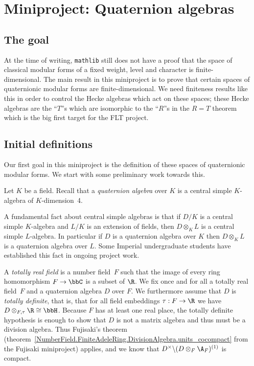 \chapter{Miniproject: Quaternion algebras}\label{Quat_alg_project}

\section{The goal}

At the time of writing, {\tt mathlib} still does not have a proof that the space
of classical modular forms of a fixed weight, level and character is finite-dimensional.
The main result in this miniproject is to prove that certain spaces of quaternionic modular forms
are finite-dimensional. We need finiteness results
like this in order to control the Hecke algebras which act on these spaces; these Hecke
algebras are the ``$T$''s which are isomorphic to the ``$R$''s in the $R=T$ theorem which
is the big first target for the FLT project.

\section{Initial definitions}

Our first goal in this miniproject is the definition of these spaces of quaternionic modular forms.
We start with some preliminary work towards this.

Let $K$ be a field. Recall that a \emph{quaternion algebra}
over $K$ is a central simple $K$-algebra of $K$-dimension~4.

A fundamental fact about central simple algebras is that if $D/K$
is a central simple $K$-algebra and $L/K$ is an extension of fields, then $D\otimes_KL$
is a central simple $L$-algebra. In particular if $D$ is a quaternion algebra over $K$
then $D\otimes_KL$ is a quaternion algebra over $L$. Some Imperial undergraduate students have established
this fact in ongoing project work.

A \emph{totally real field} is a number field~$F$ such that the image of every ring
homomorphism $F\to\bbC$ is a subset of $\R$. We fix once and for all a totally real field~$F$ and a
quaternion algebra $D$ over $F$. We furthermore assume that $D$ is \emph{totally definite}, that is,
that for all field embeddings $\tau:F\to\R$ we have $D\otimes_{F,\tau}\R\cong\bbH$. Because $F$
has at least one real place, the totally definite hypothesis is enough to show that $D$
is not a matrix algebra and thus must be a division algebra. Thus Fujisaki's theorem (theorem~\ref{NumberField.FiniteAdeleRing.DivisionAlgebra.units_cocompact}
from the Fujisaki miniproject) applies, and we know that $D^\times\backslash (D\otimes_F\A_F)^{(1)}$
is compact.

